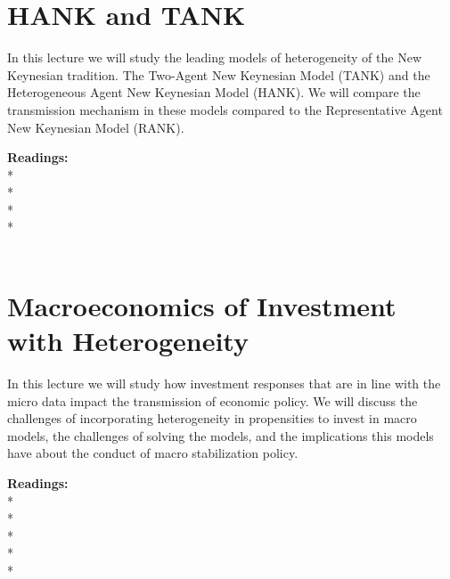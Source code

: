 \documentclass [12pt]{article}
\begin{document}
\section{HANK and TANK}

In this lecture we will study the leading models of heterogeneity of the New Keynesian tradition. The Two-Agent New Keynesian Model (TANK) and the Heterogeneous Agent New Keynesian Model (HANK). We will compare the transmission mechanism in these models compared to the Representative Agent New Keynesian Model (RANK).

\noindent\textbf{Readings:}\\
*\\
*\\
*\\
* \\
\\






\section{Macroeconomics of Investment with Heterogeneity}

In this lecture we will study how investment responses that are in line with the micro data impact the transmission of economic policy. We will discuss the challenges of incorporating heterogeneity in propensities to invest in macro models, the challenges of solving the models, and the implications this models have about the conduct of macro stabilization policy.

\noindent\textbf{Readings:}\\
* \\
* \\
* \\
* \\
*\\
\\
\\
 \\
\end{document}
